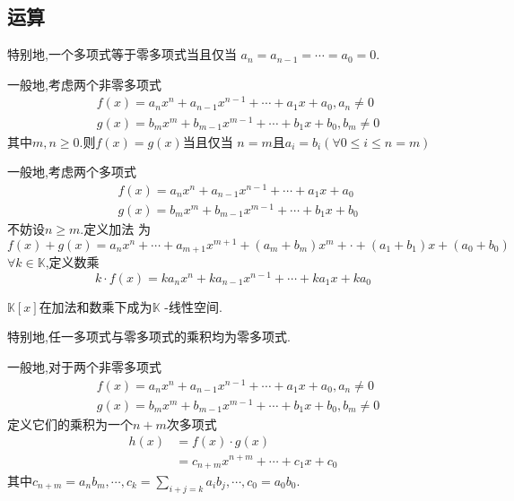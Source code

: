\subsection{运算}
\begin{formal}
\begin{definition}[多项式的相等]\label{def:多项式的相等}
    特别地,一个多项式等于零多项式当且仅当
    $a_n=a_{n-1}=\cdots=a_0=0$.

一般地,考虑两个非零多项式
\begin{align*}
&f\left(x\right)=a_nx^n+a_{n-1}x^{n-1}+\cdots+a_1x+a_0,a_n\neq 0\\
&g\left(x\right)=b_mx^m+b_{m-1}x^{m-1}+\cdots+b_1x+b_0,b_m\neq 0
\end{align*}
其中$m,n\geqslant 0.$则$f\left(x\right)=g\left(x\right)$当且仅当
$n=m$且$a_i=b_i\left(\forall 0\leqslant i\leqslant n=m\right)$
\end{definition}
\end{formal}
\begin{formal}
\begin{definition}[加法和数乘运算的定义]\label{def:加法和数乘运算的定义}
    一般地,考虑两个多项式
\begin{align*}
&f\left(x\right)=a_nx^n+a_{n-1}x^{n-1}+\cdots+a_1x+a_0\\
&g\left(x\right)=b_mx^m+b_{m-1}x^{m-1}+\cdots+b_1x+b_0
\end{align*}
不妨设$n\geqslant m$.定义加法
为\[
f\left(x\right)+g\left(x\right)=a_nx^n+\cdots+a_{m+1}x^{m+1}+\left(a_m+b_m\right)x^m+\cdot+\left(a_1+b_1\right)x+\left(a_0+b_0\right)
\]
$\forall k\in\mathbb{K}$,定义数乘
\[
k\cdot f\left(x\right)=ka_nx^n+ka_{n-1}x^{n-1}+\cdots+ka_1x+ka_0
\]
\end{definition}
\end{formal}
\begin{formal}
\begin{theorem}[线性空间性]\label{thm:线性空间性}
    $\mathbb{K}\left[x\right]$在加法和数乘下成为$\mathbb{K}$
    -线性空间.
\end{theorem}
\end{formal}
\begin{formal}
\begin{definition}[乘法的定义]\label{def:乘法的定义}
    特别地,任一多项式与零多项式的乘积均为零多项式.

    一般地,对于两个非零多项式
\begin{align*}
&f\left(x\right)=a_nx^n+a_{n-1}x^{n-1}+\cdots+a_1x+a_0,a_n\neq 0\\
&g\left(x\right)=b_mx^m+b_{m-1}x^{m-1}+\cdots+b_1x+b_0,b_m\neq 0
\end{align*}
定义它们的乘积为一个$n+m$次多项式
\begin{align*}
    h\left(x\right)&=f\left(x\right)\cdot g\left(x\right)\\
    &=c_{n+m}x^{n+m}+\cdots+c_1x+c_0
\end{align*}
其中$\displaystyle
c_{n+m}=a_nb_m,\cdots,c_k=\sum_{i+j=k}a_ib_j,\cdots,c_0=a_0b_0.
$
\end{definition}
\end{formal}
